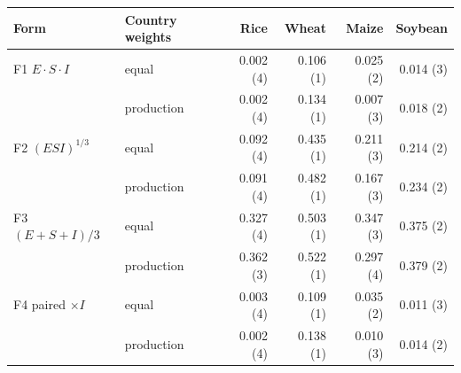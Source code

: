 \begin{tabular}{llrrrr}
\toprule
Form & Country weights & Rice & Wheat & Maize & Soybean\\
\midrule
F1 $E\cdot S\cdot I$ & equal & 0.002 (4) & 0.106 (1) & 0.025 (2) & 0.014 (3) \\
 & production & 0.002 (4) & 0.134 (1) & 0.007 (3) & 0.018 (2) \\
F2 $(E S I)^{1/3}$ & equal & 0.092 (4) & 0.435 (1) & 0.211 (3) & 0.214 (2) \\
 & production & 0.091 (4) & 0.482 (1) & 0.167 (3) & 0.234 (2) \\
F3 $(E+S+I)/3$ & equal & 0.327 (4) & 0.503 (1) & 0.347 (3) & 0.375 (2) \\
 & production & 0.362 (3) & 0.522 (1) & 0.297 (4) & 0.379 (2) \\
F4 paired $\times I$ & equal & 0.003 (4) & 0.109 (1) & 0.035 (2) & 0.011 (3) \\
 & production & 0.002 (4) & 0.138 (1) & 0.010 (3) & 0.014 (2) \\
\bottomrule
\end{tabular}
